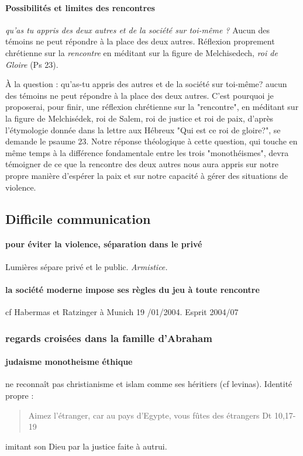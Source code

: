 \paragraph{Possibilités et limites des rencontres } \textit{qu'as tu appris des deux autres et de la société sur toi-même ? } Aucun des témoins ne peut répondre à la place des deux autres.
Réflexion proprement chrétienne sur la \textit{rencontre} en méditant sur la figure de Melchisedech, \textit{roi de Gloire} (Ps 23).


À la question : qu'as-tu appris des autres et de la société sur toi-même? aucun des témoins ne peut répondre à la place des deux autres. C'est pourquoi je proposerai, pour finir, une réflexion chrétienne sur la "rencontre", en méditant sur la figure de Melchisédek, roi de Salem, roi de justice et roi de paix, d'après l'étymologie donnée dans la lettre aux Hébreux "Qui est ce roi de gloire?", se demande le psaume 23. Notre réponse théologique à cette question, qui touche en même temps à la différence fondamentale entre les trois "monothéismes", devra témoigner de ce que la rencontre des deux autres nous aura appris sur notre propre manière d'espérer la paix et sur notre capacité à gérer des situations de violence.
\subsection{Difficile communication}

\paragraph{pour éviter la violence, séparation dans le privé} Lumières sépare privé et le public.  \textit{Armistice. } 

\paragraph{la société moderne impose ses règles du jeu à toute rencontre} cf Habermas et Ratzinger à Munich 19 /01/2004.  Esprit 2004/07

\subsubsection{regards croisées dans la famille d'Abraham}

\paragraph{judaisme monotheisme éthique} ne reconnaît pas christianisme et islam comme ses héritiers (cf levinas). Identité propre :
\begin{quote}
    Aimez l'étranger, car au pays d'Egypte, vous fûtes des étrangers Dt 10,17-19
\end{quote}
imitant son Dieu par la justice faite à autrui.


